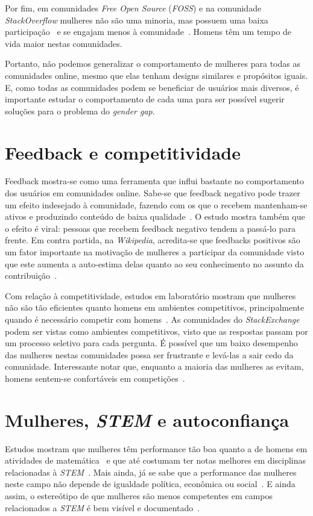 Por fim, em comunidades \textit{Free Open Source} (\emph{FOSS}) e na comunidade \emph{StackOverflow} mulheres não são uma minoria, mas possuem uma baixa participação~\cite{rustad2011suck} e se engajam menos à comunidade~\cite{Vasilescu27092013}. Homens têm um tempo de vida maior nestas comunidades.

Portanto, não podemos generalizar o comportamento de mulheres para todas as comunidades online, mesmo que elas tenham designs similares e propósitos iguais. E, como todas as comunidades podem se beneficiar de usuários mais diversos, é importante estudar o comportamento de cada uma para ser possível sugerir soluções para o problema do \textit{gender gap}.

\section{Feedback e competitividade}

Feedback mostra-se como uma ferramenta que influi bastante no comportamento dos usuários em comunidades online. Sabe-se que feedback negativo pode trazer um efeito indesejado à comunidade, fazendo com os que o recebem mantenham-se ativos e produzindo conteúdo de baixa qualidade~\cite{cheng2014community}. O estudo mostra também que o efeito é viral: pessoas que recebem feedback negativo tendem a passá-lo para frente. Em contra partida, na \emph{Wikipedia}, acredita-se que feedbacks positivos são um fator importante na motivação de mulheres a participar da comunidade visto que este aumenta a auto-estima delas quanto ao seu conhecimento no assunto da contribuição~\cite{collier2012conflict}.

Com relação à competitividade, estudos em laboratório mostram que mulheres não são tão eficientes quanto homens em ambientes competitivos, principalmente quando é necessário competir com homens~\cite{gneezy2003performance}. As comunidades do \emph{StackExchange} podem ser vistas como ambientes competitivos, visto que as respostas passam por um processo seletivo para cada pergunta. É possível que um baixo desempenho das mulheres nestas comunidades possa ser frustrante e levá-las a sair cedo da comunidade. Interessante notar que, enquanto a maioria das mulheres as evitam, homens sentem-se confortáveis em competições~\cite{niederle2005women,croson2009gender}.

\section{Mulheres, \emph{STEM} e autoconfiança}
Estudos mostram que mulheres têm performance tão boa quanto a de homens em atividades de matemática~\cite{hyde1990gender,campbell1986effects} e que até costumam ter notas melhores em disciplinas relacionadas à \emph{STEM}~\cite{stoet2015sex}. Mais ainda, já se sabe que a performance das mulheres neste campo não depende de igualdade política, econômica ou social~\cite{stoet2015sex}. E ainda assim, o estereótipo de que mulheres são menos competentes em campos relacionados a \emph{STEM} é bem visível e documentado~\cite{moss2012science}.

